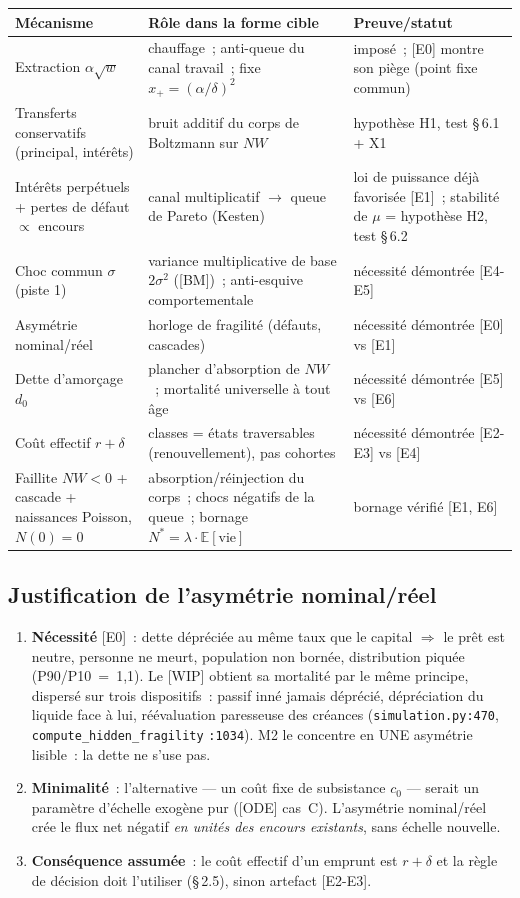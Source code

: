 \documentclass[11pt,a4paper]{article}
\newcommand{\NW}{\mathit{NW}}
\begin{document}
\begin{xltabular}{\linewidth}{@{}>{\raggedright\arraybackslash}p{4.1cm}X>{\raggedright\arraybackslash}p{4.6cm}@{}}
\toprule
Mécanisme & Rôle dans la forme cible & Preuve/statut \\
\midrule
\endhead
Extraction $\alpha\sqrt{w}$ & chauffage~; anti-queue du canal travail~; fixe $x_+=(\alpha/\delta)^2$ & imposé~; [E0] montre son piège (point fixe commun) \\
Transferts conservatifs (principal, intérêts) & bruit additif du corps de Boltzmann sur $\NW$ & hypothèse H1, test \S\,6.1 + X1 \\
Intérêts perpétuels + pertes de défaut $\propto$ encours & canal multiplicatif $\to$ queue de Pareto (Kesten) & loi de puissance déjà favorisée [E1]~; stabilité de $\mu$ = hypothèse H2, test \S\,6.2 \\
Choc commun $\sigma$ (piste 1) & variance multiplicative de base $2\sigma^2$ ([BM])~; anti-esquive comportementale & nécessité démontrée [E4-E5] \\
Asymétrie nominal/réel & horloge de fragilité (défauts, cascades) & nécessité démontrée [E0] vs [E1] \\
Dette d'amorçage $d_0$ & plancher d'absorption de $\NW$~; mortalité universelle à tout âge & nécessité démontrée [E5] vs [E6] \\
Coût effectif $r+\delta$ & classes = états traversables (renouvellement), pas cohortes & nécessité démontrée [E2-E3] vs [E4] \\
Faillite $\NW<0$ + cascade + naissances Poisson, $N(0)=0$ & absorption/réinjection du corps~; chocs négatifs de la queue~; bornage $N^*=\lambda\cdot\mathbb E[\text{vie}]$ & bornage vérifié [E1, E6] \\
\bottomrule
\end{xltabular}

\subsection{Justification de l'asymétrie nominal/réel}
\label{sec:asymetrie}

\begin{enumerate}
  \item \textbf{Nécessité} [E0]~: dette dépréciée au même taux que le capital $\Rightarrow$ le prêt est neutre, personne ne meurt, population non bornée, distribution piquée (P90/P10~=~1,1). Le [WIP] obtient sa mortalité par le même principe, dispersé sur trois dispositifs~: passif inné jamais déprécié, dépréciation du liquide face à lui, réévaluation paresseuse des créances (\texttt{simulation.py:470}, \texttt{compute_hidden_fragility} \texttt{:1034}). M2 le concentre en UNE asymétrie lisible~: la dette ne s'use pas.
  \item \textbf{Minimalité}~: l'alternative --- un coût fixe de subsistance $c_0$ --- serait un paramètre d'échelle exogène pur ([ODE] cas~C). L'asymétrie nominal/réel crée le flux net négatif \emph{en unités des encours existants}, sans échelle nouvelle.
  \item \textbf{Conséquence assumée}~: le coût effectif d'un emprunt est $r+\delta$ et la règle de décision doit l'utiliser (\S\,2.5), sinon artefact [E2-E3].
\end{enumerate}
\end{document}
